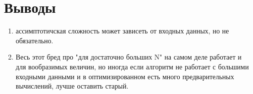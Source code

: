 \documentclass[a4paper, 12pt]{report}
\begin{document}
	\section*{Выводы}
		\begin{enumerate}
			\item ассимптотичская сложность может зависеть от входных данных, но не обязательно.
			\item Весь этот бред про "для достаточно больших N" на самом деле работает и для вообразимых величин, но иногда если алгоритм не работает с большими входными данными и в оптимизированном есть много предварительных вычислений, лучше оставить старый.
		\end{enumerate}
\end{document}
